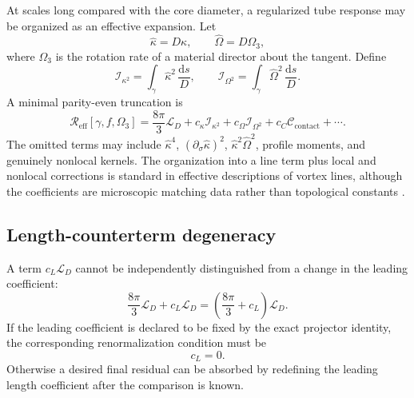 \documentclass[aps,pre,preprint,notitlepage,nofootinbib,superscriptaddress]{revtex4-2}
\newcommand{\dd}{\mathrm d}
\newcommand{\calL}{\mathcal L}
\newcommand{\calI}{\mathcal I}
\newcommand{\calC}{\mathcal C}
\newcommand{\Reff}{\mathscr R_{\mathrm{eff}}}
\begin{document}
At scales long compared with the core diameter, a regularized tube response may be organized as an effective expansion.  Let
\begin{equation}
  \widehat\kappa=D\kappa,
  \qquad
  \widehat\Omega=D\Omega_3,
\end{equation}
where $\Omega_3$ is the rotation rate of a material director about the tangent.  Define
\begin{equation}
  \calI_{\kappa^2}=\int_\gamma \widehat\kappa^2\,\frac{\dd s}{D},
  \qquad
  \calI_{\Omega^2}=\int_\gamma \widehat\Omega^2\,\frac{\dd s}{D}.
  \label{eq:operators}
\end{equation}
A minimal parity-even truncation is
\begin{equation}
  \boxed{
  \Reff[\gamma,f,\Omega_3]
  =\frac{8\pi}{3}\calL_D
  +c_\kappa\calI_{\kappa^2}
  +c_\Omega\calI_{\Omega^2}
  +c_C\calC_{\mathrm{contact}}
  +\cdots.}
  \label{eq:response-expansion}
\end{equation}
The omitted terms may include $\widehat\kappa^4$, $(\partial_\sigma\widehat\kappa)^2$, $\widehat\kappa^2\widehat\Omega^2$, profile moments, and genuinely nonlocal kernels.  The organization into a line term plus local and nonlocal corrections is standard in effective descriptions of vortex lines, although the coefficients are microscopic matching data rather than topological constants \cite{HornNicolisPenco2015}.

\subsection{Length-counterterm degeneracy}

A term $c_L\calL_D$ cannot be independently distinguished from a change in the leading coefficient:
\begin{equation}
  \frac{8\pi}{3}\calL_D+c_L\calL_D
  =\left(\frac{8\pi}{3}+c_L\right)\calL_D.
\end{equation}
If the leading coefficient is declared to be fixed by the exact projector identity, the corresponding renormalization condition must be
\begin{equation}
  \boxed{c_L=0.}
  \label{eq:cLzero}
\end{equation}
Otherwise a desired final residual can be absorbed by redefining the leading length coefficient after the comparison is known.
\end{document}
